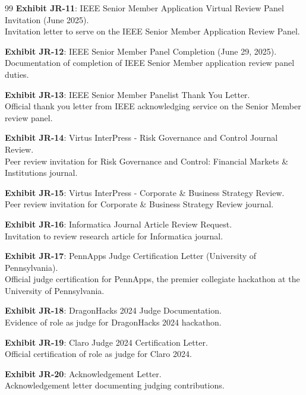 \documentclass[11pt]{article}
\begin{document}
\begin{thebibliography}{99}
\textbf{Exhibit JR-11}: IEEE Senior Member Application Virtual Review Panel Invitation (June 2025).
\\Invitation letter to serve on the IEEE Senior Member Application Review Panel.

\textbf{Exhibit JR-12}: IEEE Senior Member Panel Completion (June 29, 2025).
\\Documentation of \drs completion of IEEE Senior Member application review panel duties.

\textbf{Exhibit JR-13}: IEEE Senior Member Panelist Thank You Letter.
\\Official thank you letter from IEEE acknowledging \drs service on the Senior Member review panel.

\textbf{Exhibit JR-14}: Virtus InterPress - Risk Governance and Control Journal Review.
\\Peer review invitation for Risk Governance and Control: Financial Markets \& Institutions journal.

\textbf{Exhibit JR-15}: Virtus InterPress - Corporate \& Business Strategy Review.
\\Peer review invitation for Corporate \& Business Strategy Review journal.

\textbf{Exhibit JR-16}: Informatica Journal Article Review Request.
\\Invitation to review research article for Informatica journal.

\textbf{Exhibit JR-17}: PennApps Judge Certification Letter (University of Pennsylvania).
\\Official judge certification for PennApps, the premier collegiate hackathon at the University of Pennsylvania.

\textbf{Exhibit JR-18}: DragonHacks 2024 Judge Documentation.
\\Evidence of \drs role as judge for DragonHacks 2024 hackathon.

\textbf{Exhibit JR-19}: Claro Judge 2024 Certification Letter.
\\Official certification of \drs role as judge for Claro 2024.

\textbf{Exhibit JR-20}: Acknowledgement Letter.
\\Acknowledgement letter documenting \drs judging contributions.


\end{thebibliography}
\end{document}

